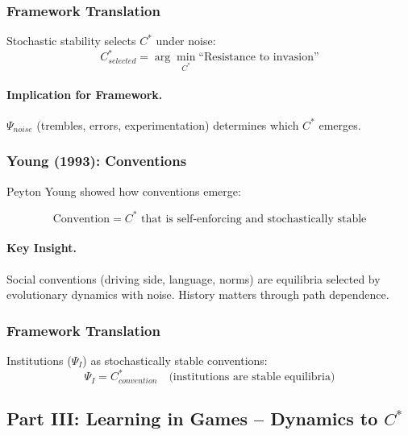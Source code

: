 \subsubsection{Framework Translation}

Stochastic stability selects $C^*$ under noise:
\begin{equation}
C^*_{selected} = \arg\min_{C^*} \text{``Resistance to invasion''}
\end{equation}

\paragraph{Implication for Framework.}
$\Psi_{noise}$ (trembles, errors, experimentation) determines which $C^*$ emerges.

\subsubsection{Young (1993): Conventions}

Peyton Young showed how conventions emerge:

\begin{equation}
\boxed{
\text{Convention} = C^* \text{ that is self-enforcing and stochastically stable}
}
\label{eq:young-convention}
\end{equation}

\paragraph{Key Insight.}
Social conventions (driving side, language, norms) are equilibria selected by 
evolutionary dynamics with noise. History matters through path dependence.

\subsubsection{Framework Translation}

Institutions ($\Psi_I$) as stochastically stable conventions:
\begin{equation}
\Psi_I = C^*_{convention} \quad \text{(institutions are stable equilibria)}
\end{equation}

\subsection{Part III: Learning in Games – Dynamics to $C^*$}

